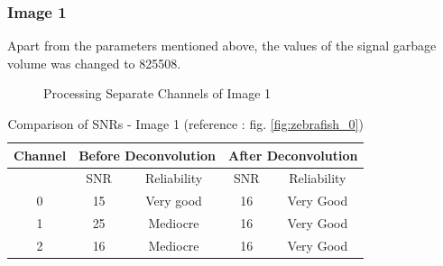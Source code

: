 \documentclass{article}
\begin{document}
\subsubsection*{Image 1}
Apart from the parameters mentioned above, the values of the signal garbage volume was changed to 825508. 
\begin{figure}[h!]
\centering
{}
\vspace{5 mm}
\caption{Processing Separate Channels of Image 1}
\label{fig:tuning-image1}
\end{figure}
\begin{table}[h!]
\centering
\caption{Comparison of SNRs - Image 1 (reference : fig. \ref{fig:zebrafish_0})}
\begin{tabular}{*5c}
\toprule
Channel &  \multicolumn{2}{c}{Before Deconvolution} & \multicolumn{2}{c}{After Deconvolution}\\
\midrule
{}   & SNR   & Reliability    & SNR   & Reliability \\
0   &  15 & Very good   & 16  & Very Good\\
1   &  25 & Mediocre & 16  & Very Good\\
2   &  16  &  Mediocre & 16  & Very Good\\
\bottomrule
\end{tabular}
\end{table}
\end{document}

